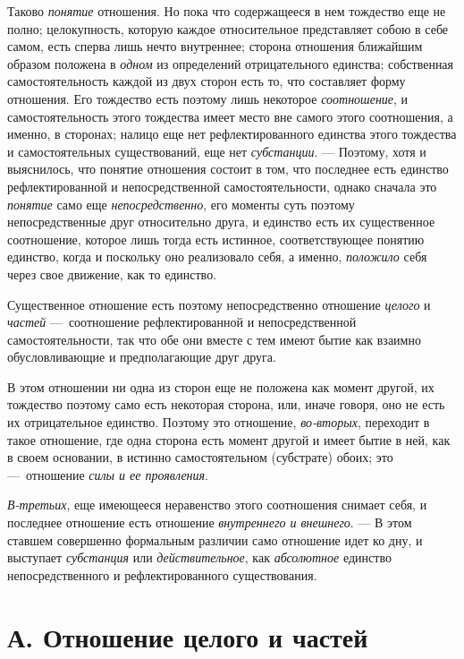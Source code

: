 Таково {\em понятие} отношения. Но пока что содержащееся
в нем тождество еще не полно; целокупность, которую каждое относительное
представляет собою в себе самом, есть сперва лишь нечто внутреннее; сторона
отношения ближайшим образом положена в {\em одном} из
определений отрицательного единства; собственная самостоятельность каждой
из двух сторон есть то, что составляет форму отношения. Его тождество есть
поэтому лишь некоторое {\em соотношение}, и
самостоятельность этого тождества имеет место вне самого этого соотношения,
а именно, в сторонах; налицо еще нет рефлектированного единства этого
тождества и самостоятельных существований, еще нет
{\em субстанции}. — Поэтому, хотя и выяснилось, что
понятие отношения состоит в том, что последнее есть единство
рефлектированной и непосредственной самостоятельности, однако сначала это
{\em понятие} само еще
{\em непосредственно}, его моменты суть поэтому
непосредственные друг относительно друга, и единство есть их существенное
соотношение, которое лишь тогда есть истинное, соответствующее понятию
единство, когда и поскольку оно реализовало себя, а именно,
{\em положило} себя через свое движение, как то
единство.

Существенное отношение есть поэтому непосредственно отношение
{\em целого} и {\em частей}
—~соотношение рефлектированной и непосредственной самостоятельности, так
что обе они вместе с тем имеют бытие как взаимно обусловливающие и
предполагающие друг друга.

В этом отношении ни одна из сторон еще не положена как момент другой, их
тождество поэтому само есть некоторая сторона, или, иначе говоря, оно не
есть их отрицательное единство. Поэтому это отношение,
{\em во-вторых}, переходит в такое отношение, где одна
сторона есть момент другой и имеет бытие в ней, как в своем основании, в
истинно самостоятельном (субстрате) обоих; это —~отношение
{\em силы и ее проявления}.

{\em В-третьих}, еще имеющееся неравенство этого
соотношения снимает себя, и последнее отношение есть отношение
{\em внутреннего и внешнего}. — В этом ставшем
совершенно формальным различии само отношение идет ко дну, и выступает
{\em субстанция} или
{\em действительное}, как
{\em абсолютное} единство непосредственного и
рефлектированного существования.


\section[А. Отношение целого и частей]{А. Отношение целого и частей}

